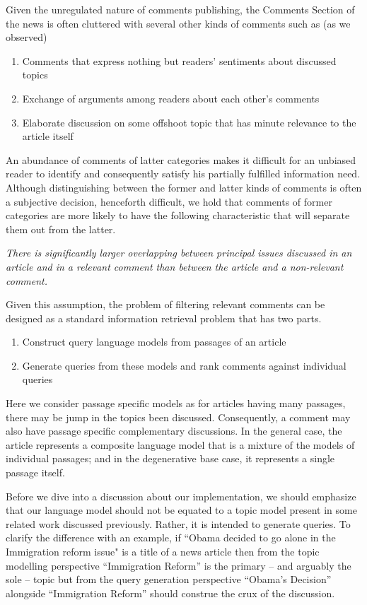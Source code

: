 \documentclass[article]{IEEEtran}
\newcounter{tmpc}
\begin{document}
Given the unregulated nature of comments publishing, the Comments Section of the news is often cluttered with several other kinds of comments such as (as we observed)

\begin{enumerate}
\setcounter{enumi}{\thetmpc}
\item Comments that express nothing but readers' sentiments about discussed topics
\item Exchange of arguments among readers about each other's comments
\item Elaborate discussion on some offshoot topic that has minute relevance to the article itself
\end{enumerate} 

An abundance of comments of latter categories makes it difficult for an unbiased reader to identify and consequently satisfy his partially fulfilled information need. Although distinguishing between the former and latter kinds of comments is often a subjective decision, henceforth difficult, we hold that comments of former categories are more likely to have the following characteristic that will separate them out from the latter.
\bigskip

\textit{There is significantly larger overlapping between principal issues discussed in an article and in a relevant comment than between the article and a non-relevant comment.}    
\bigskip

Given this assumption, the problem of filtering relevant comments can be designed as a standard information retrieval problem that has two parts.

\begin{enumerate}
\item Construct query language models from passages of an article 
\item Generate queries from these models and rank comments against individual queries
\end{enumerate}

Here we consider passage specific models as for articles having many passages, there may be jump in the topics been discussed. Consequently, a comment may also have passage specific complementary discussions. In the general case, the article represents a composite language model that is a mixture of the models of individual passages; and in the degenerative base case, it represents a single passage itself.  

Before we dive into a discussion about our implementation, we should emphasize that our language model should not be equated to a topic model present in some related work discussed previously. Rather, it is intended to generate queries. To clarify the difference with an example, if ``Obama decided to go alone in the Immigration reform issue" is a title of a news article then from the topic modelling perspective ``Immigration Reform'' is the primary -- and arguably the sole -- topic but from the query generation perspective ``Obama's Decision'' alongside ``Immigration Reform'' should construe the crux of the discussion.    
\end{document}
